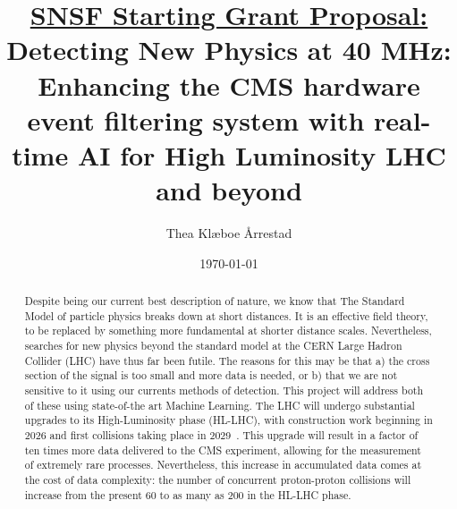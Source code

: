 \documentclass[12pt]{iopart}
\begin{document}
\title[Real-time AI for HL-LHC and beyond (SNSF SG Proposal, T. K. \AA rrestad)]{
\underline{SNSF Starting Grant Proposal:}\\\vspace{5mm}
{Detecting New Physics at 40 MHz:\\
Enhancing the CMS hardware event filtering system with real-time AI for High Luminosity LHC and beyond}}
\author{Thea Kl\ae boe \AA rrestad}
\address{ETH Zürich, Switzerland}
\date{\today}



\begin{abstract}
Despite being our current best description of nature, we know that The Standard Model of particle physics breaks down at short distances. It is an effective field theory, to be replaced by something more fundamental at shorter distance scales. Nevertheless, searches for new physics beyond the standard model at the CERN Large Hadron Collider (LHC) have thus far been futile. The reasons for this may be that a) the cross section of the signal is too small and more data is needed, or b) that we are not sensitive to it using our currents methods of detection. This project will address both of these using state-of-the art Machine Learning. The LHC will undergo substantial upgrades to its High-Luminosity phase (HL-LHC), with construction work beginning in 2026 and first collisions taking place in 2029~\cite{LHC2022LongTerm}. This upgrade will result in a factor of ten times more data delivered to the CMS experiment, allowing for the measurement of extremely rare processes. Nevertheless, this increase in accumulated data comes at the cost of data complexity: the number of concurrent proton-proton collisions will increase from the present 60 to as many as 200 in the HL-LHC phase.


\end{abstract}
\end{document}
